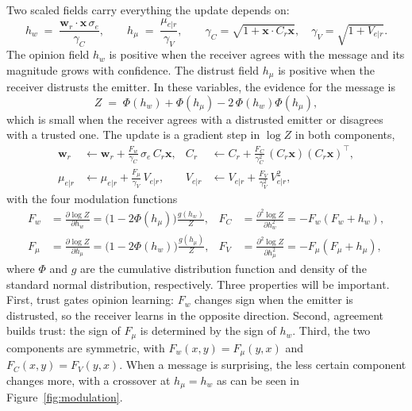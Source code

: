 \documentclass{article}
\newcommand{\hw}{h_{w}}
\newcommand{\hmu}{h_{\mu}}
\newcommand{\Fw}{F_{w}}
\newcommand{\Fmu}{F_{\mu}}
\newcommand{\FC}{F_{C}}
\newcommand{\FV}{F_{V}}
\begin{document}
Two scaled fields carry everything the update depends on:
%
\begin{equation}
  \hw \;=\; \frac{\mathbf{w}_r\cdot\mathbf{x}\,\sigma_e}{\gamma_C},
  \qquad
  \hmu \;=\; \frac{\mu_{e|r}}{\gamma_V},
  \qquad
  \gamma_C=\sqrt{1+\mathbf{x}\cdot C_r\mathbf{x}},\quad \gamma_V=\sqrt{1+V_{e|r}} .
  \label{eq:fields}
\end{equation}
%
The opinion field $\hw$ is positive when the receiver agrees with the message and
its magnitude grows with confidence. The distrust field $\hmu$ is positive when
the receiver distrusts the emitter. In these variables, the evidence for the
message is
%
\begin{equation}
  Z \;=\; \Phi(\hw) + \Phi(\hmu) - 2\,\Phi(\hw)\Phi(\hmu),
  \label{eq:evidence}
\end{equation}
%
which is small when the receiver agrees with a distrusted emitter or disagrees with
a trusted one. The update is a gradient step in $\log Z$ in both components,
%
\begin{align}
  \mathbf{w}_r &\leftarrow \mathbf{w}_r + \frac{\Fw}{\gamma_C}\,\sigma_e\,C_r\mathbf{x},
  &
  C_r &\leftarrow C_r + \frac{\FC}{\gamma_C^{2}}\,(C_r\mathbf{x})(C_r\mathbf{x})^{\!\top},
  \label{eq:update-ideo}\\
  \mu_{e|r} &\leftarrow \mu_{e|r} + \frac{\Fmu}{\gamma_V}\,V_{e|r},
  &
  V_{e|r} &\leftarrow V_{e|r} + \frac{\FV}{\gamma_V^{2}}\,V_{e|r}^{2},
  \label{eq:update-aff}
\end{align}
%
with the four modulation functions
%
\begin{align}
  \Fw &= \frac{\partial\log Z}{\partial\hw} = \bigl(1-2\Phi(\hmu)\bigr)\frac{g(\hw)}{Z},
  &\FC &= \frac{\partial^{2}\log Z}{\partial\hw^{2}} = -\Fw(\Fw+\hw),
  \label{eq:w-modulation}
  \\
  \Fmu &= \frac{\partial\log Z}{\partial\hmu} = \bigl(1-2\Phi(\hw)\bigr)\frac{g(\hmu)}{Z},
  &\FV &= \frac{\partial^{2}\log Z}{\partial\hmu^{2}} = -\Fmu(\Fmu+\hmu),
  \label{eq:mu-modulation}
\end{align}
%
where $\Phi$ and $g$ are the cumulative distribution function and density of the
standard normal distribution, respectively. Three properties will be important.
First, trust gates opinion learning: $\Fw$ changes sign when the emitter is
distrusted, so the receiver learns in the opposite direction. Second, agreement
builds trust: the sign of $\Fmu$ is determined by the sign of $\hw$. Third, the two
components are symmetric, with $\Fw(x,y)=\Fmu(y,x)$ and
$\FC(x,y)=\FV(y,x)$. When a message is surprising, the less certain component
changes more, with a crossover at $\hmu=\hw$ as can be seen in Figure~\ref{fig:modulation}.
\end{document}
